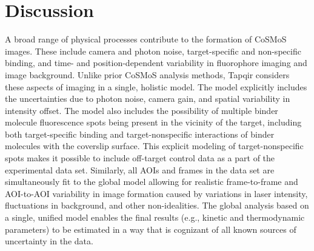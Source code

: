 \section*{Discussion}


A broad range of physical processes contribute to the formation of CoSMoS images. These include camera and photon noise, target-specific and non-specific binding, and time- and position-dependent variability in fluorophore imaging and image background. Unlike prior CoSMoS analysis methods, Tapqir considers these aspects of imaging in a single, holistic model. The model explicitly includes the uncertainties due to photon noise, camera gain, and spatial variability in intensity offset. The model also includes the possibility of multiple binder molecule fluorescence spots being present in the vicinity of the target, including both target-specific binding and target-nonspecific interactions of binder molecules with the coverslip surface. This explicit modeling of target-nonspecific spots makes it possible to include off-target control data as a part of the experimental data set.  Similarly, all AOIs and frames in the data set are simultaneously fit to the global model allowing for realistic frame-to-frame and AOI-to-AOI variability in image formation caused by variations in laser intensity, fluctuations in background, and other non-idealities. The global analysis based on a single, unified model enables the final results (e.g., kinetic and thermodynamic parameters) to be estimated in a way that is cognizant of all known sources of uncertainty in the data. 

